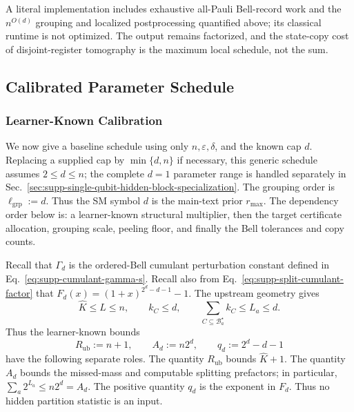 \documentclass[
  aps,
  prx,
  reprint,
  superscriptaddress,
  amsmath,
  amssymb,
  nofootinbib,
  longbibliography
]{revtex4-2}
\begin{document}
A literal implementation includes exhaustive all-Pauli Bell-record work and
the $n^{O(d)}$ grouping and localized postprocessing quantified above; its
classical runtime is not optimized.  The output remains factorized, and the
state-copy cost of disjoint-register tomography is the maximum local schedule,
not the sum.



\subsection{Calibrated Parameter Schedule}
\label{sec:supp-calibrated-schedule}

\subsubsection{Learner-Known Calibration}
\label{sec:supp-learner-known-calibration}

We now give a baseline schedule using only \(n,\varepsilon,\delta\), and
the known cap \(d\).  Replacing a supplied cap by \(\min\{d,n\}\) if
necessary, this generic schedule assumes \(2\le d\le n\); the complete
\(d=1\) parameter range is handled separately in
Sec.~\ref{sec:supp-single-qubit-hidden-block-specialization}.  The grouping order is
\(\ell_{\mathrm{grp}}:=d\).  Thus the SM symbol \(d\) is the main-text
prior \(r_{\max}\).  The dependency order below is: a learner-known
structural multiplier, then the target certificate allocation, grouping
scale, peeling floor, and finally the Bell tolerances and copy counts.

Recall that \(\Gamma_d\) is the ordered-Bell cumulant perturbation constant
defined in Eq.~\eqref{eq:supp-cumulant-gamma-s}.  Recall also from
Eq.~\eqref{eq:supp-split-cumulant-factor} that
\(F_d(x)=(1+x)^{2^d-d-1}-1\).  The upstream geometry gives
\begin{equation}
\widehat K\le L\le n,\qquad
k_C\le d,\qquad
\sum_{C\subseteq\mathcal B_a^\star}k_C\le L_a\le d.
\end{equation}
Thus the learner-known bounds
\begin{equation}
R_{\mathrm{ub}}:=n+1,
\qquad
A_d:=n2^d,
\qquad
q_d:=2^d-d-1
\label{eq:supp-calibrated-known-bounds}
\end{equation}
have the following separate roles.  The quantity \(R_{\mathrm{ub}}\) bounds
\(\widehat K+1\).  The quantity \(A_d\) bounds the missed-mass and
computable splitting prefactors; in particular,
\(\sum_a2^{L_a}\le n2^d=A_d\).  The positive quantity \(q_d\) is the
exponent in \(F_d\).  Thus no hidden partition statistic is an input.
\end{document}
